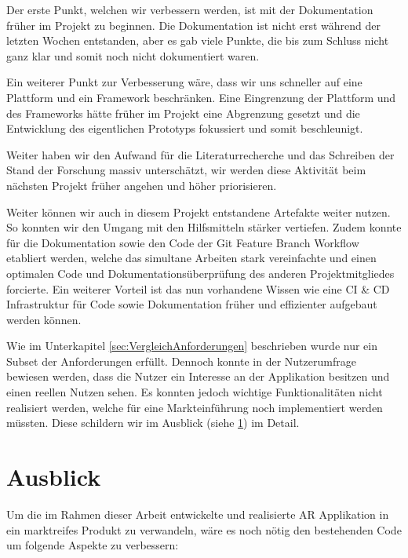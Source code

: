\documentclass[a4paper]{scrreprt}
\begin{document}
Der erste Punkt, welchen wir verbessern werden, ist mit der Dokumentation früher im Projekt zu beginnen.  Die Dokumentation ist nicht erst während der letzten Wochen entstanden, aber es gab viele Punkte, die bis zum Schluss nicht ganz klar und somit noch nicht dokumentiert waren.

Ein weiterer Punkt zur Verbesserung wäre, dass wir uns schneller auf eine Plattform und ein Framework beschränken. Eine Eingrenzung der Plattform und des Frameworks hätte früher im Projekt eine Abgrenzung gesetzt und die Entwicklung des eigentlichen Prototyps fokussiert und somit beschleunigt.

Weiter haben wir den Aufwand für die Literaturrecherche und das Schreiben der Stand der Forschung massiv unterschätzt, wir werden diese Aktivität beim nächsten Projekt früher angehen und höher priorisieren.

Weiter können wir auch in diesem Projekt entstandene Artefakte weiter nutzen. So konnten wir den Umgang mit den Hilfsmitteln stärker vertiefen. Zudem konnte für die Dokumentation sowie den Code der Git Feature Branch Workflow etabliert werden, welche das simultane Arbeiten stark vereinfachte und einen optimalen Code und Dokumentationsüberprüfung des anderen Projektmitgliedes forcierte. Ein weiterer Vorteil ist das nun vorhandene Wissen wie eine CI \& CD Infrastruktur für Code sowie Dokumentation früher und effizienter aufgebaut werden können.

Wie im Unterkapitel \ref{sec:VergleichAnforderungen} beschrieben wurde nur ein Subset der Anforderungen erfüllt. Dennoch konnte in der Nutzerumfrage bewiesen werden, dass die Nutzer ein Interesse an der Applikation besitzen und einen reellen Nutzen sehen. Es konnten jedoch wichtige Funktionalitäten nicht realisiert werden, welche für eine Markteinführung noch implementiert werden müssten. Diese schildern wir im Ausblick (siehe \ref{sec:Ausblick}) im Detail.

\section{Ausblick}
\label{sec:Ausblick}
Um die im Rahmen dieser Arbeit entwickelte und realisierte AR Applikation in ein marktreifes Produkt zu verwandeln, wäre es noch nötig den bestehenden Code um folgende Aspekte zu verbessern:
\end{document}
